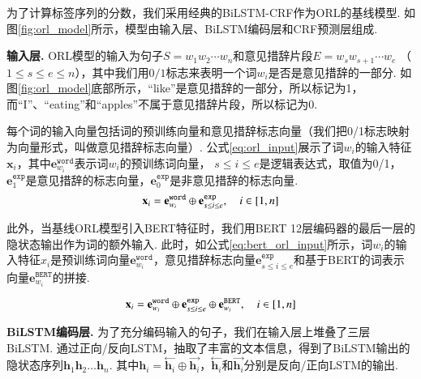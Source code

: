 为了计算标签序列的分数，我们采用经典的BiLSTM-CRF作为ORL的基线模型.
如图\ref{fig:orl_model}所示，模型由输入层、BiLSTM编码层和CRF预测层组成.

\textbf{输入层.  } ORL模型的输入为句子$S=w_1w_2\cdots w_n$和意见措辞片段$E=w_sw_{s+1}\cdots w_e$ （$1 \leq s\leq e \leq n$），其中我们用$0/1$标志来表明一个词$w_i$是否是意见措辞的一部分. 如图\ref{fig:orl_model}底部所示，“like”是意见措辞的一部分，所以标记为1，而“I”、“eating”和“apples”不属于意见措辞片段，所以标记为0.

每个词的输入向量包括词的预训练向量和意见措辞标志向量（我们把0/1标志映射为向量形式，叫做意见措辞标志向量）. 公式\ref{eq:orl_input}展示了词$w_i$的输入特征$\mathbf{x}_i$，其中$\mathbf{e}_{w_i}^{\texttt{word}}$表示词$w_i$的预训练词向量， $s\leq i\leq e$是逻辑表达式，取值为0/1，$\mathbf{e}_1^{\texttt{exp}}$是意见措辞的标志向量，$\mathbf{e}_0^{\texttt{exp}}$是非意见措辞的标志向量.
\begin{equation}
    \setlength{\abovedisplayskip}{9pt}
    \setlength{\belowdisplayskip}{9pt}
    \label{eq:orl_input}
    \mathbf{x}_i = \mathbf{e}_{w_i}^{\texttt{word}} \oplus \mathbf{e}_{s\leq i\leq e}^{\texttt{exp}}, \quad i \in [1,n]
\end{equation}

此外，当基线ORL模型引入BERT特征时，我们用BERT 12层编码器的最后一层的隐状态输出作为词的额外输入. 此时，如公式\ref{eq:bert_orl_input}所示，词$w_i$的输入特征$x_i$是预训练词向量$\mathbf{e}_{w_i}^{\texttt{word}}$，意见措辞标志向量$\mathbf{e}_{s\leq i\leq e}^{\texttt{exp}}$和基于BERT的词表示向量$\mathbf{e}_{w_i}^{\texttt{BERT}}$的拼接.

\begin{equation}
    \setlength{\abovedisplayskip}{9pt}
    \setlength{\belowdisplayskip}{9pt}
    \label{eq:bert_orl_input}
    \mathbf{x}_i = \mathbf{e}_{w_i}^{\texttt{word}} \oplus \mathbf{e}_{s\leq i\leq e}^{\texttt{exp}} \oplus \mathbf{e}_{w_i}^{\texttt{BERT}}, \quad i \in [1,n]
\end{equation}

\textbf{BiLSTM编码层.  } 为了充分编码输入的句子，我们在输入层上堆叠了三层BiLSTM.
通过正向/反向LSTM，抽取了丰富的文本信息，得到了BiLSTM输出的隐状态序列$\mathbf{h}_1 \mathbf{h}_2\dots \mathbf{h}_n$. 其中$\mathbf{h}_i=\stackrel{\leftarrow}{\mathbf{h}_i} \oplus \stackrel{\rightarrow}{\mathbf{h}_i}$，$\stackrel{\leftarrow}{\mathbf{h}_i}$和$\stackrel{\rightarrow}{\mathbf{h}_i}$分别是反向/正向LSTM的输出.

